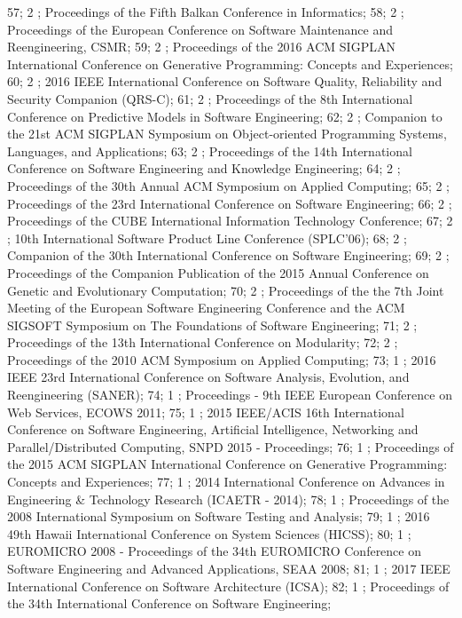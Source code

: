 57; 2 ; Proceedings of the Fifth Balkan Conference in Informatics; 
58; 2 ; Proceedings of the European Conference on Software Maintenance and Reengineering, CSMR; 
59; 2 ; Proceedings of the 2016 ACM SIGPLAN International Conference on Generative Programming: Concepts and Experiences; 
60; 2 ; 2016 IEEE International Conference on Software Quality, Reliability and Security Companion (QRS-C); 
61; 2 ; Proceedings of the 8th International Conference on Predictive Models in Software Engineering; 
62; 2 ; Companion to the 21st ACM SIGPLAN Symposium on Object-oriented Programming Systems, Languages, and Applications; 
63; 2 ; Proceedings of the 14th International Conference on Software Engineering and Knowledge Engineering; 
64; 2 ; Proceedings of the 30th Annual ACM Symposium on Applied Computing; 
65; 2 ; Proceedings of the 23rd International Conference on Software Engineering; 
66; 2 ; Proceedings of the CUBE International Information Technology Conference; 
67; 2 ; 10th International Software Product Line Conference (SPLC'06); 
68; 2 ; Companion of the 30th International Conference on Software Engineering; 
69; 2 ; Proceedings of the Companion Publication of the 2015 Annual Conference on Genetic and Evolutionary Computation; 
70; 2 ; Proceedings of the the 7th Joint Meeting of the European Software Engineering Conference and the ACM SIGSOFT Symposium on The Foundations of Software Engineering; 
71; 2 ; Proceedings of the 13th International Conference on Modularity; 
72; 2 ; Proceedings of the 2010 ACM Symposium on Applied Computing; 
73; 1 ; 2016 IEEE 23rd International Conference on Software Analysis, Evolution, and Reengineering (SANER); 
74; 1 ; Proceedings - 9th IEEE European Conference on Web Services, ECOWS 2011; 
75; 1 ; 2015 IEEE/ACIS 16th International Conference on Software Engineering, Artificial Intelligence, Networking and Parallel/Distributed Computing, SNPD 2015 - Proceedings; 
76; 1 ; Proceedings of the 2015 ACM SIGPLAN International Conference on Generative Programming: Concepts and Experiences; 
77; 1 ; 2014 International Conference on Advances in Engineering {\&} Technology Research (ICAETR - 2014); 
78; 1 ; Proceedings of the 2008 International Symposium on Software Testing and Analysis; 
79; 1 ; 2016 49th Hawaii International Conference on System Sciences (HICSS); 
80; 1 ; EUROMICRO 2008 - Proceedings of the 34th EUROMICRO Conference on Software Engineering and Advanced Applications, SEAA 2008; 
81; 1 ; 2017 IEEE International Conference on Software Architecture (ICSA); 
82; 1 ; Proceedings of the 34th International Conference on Software Engineering; 
